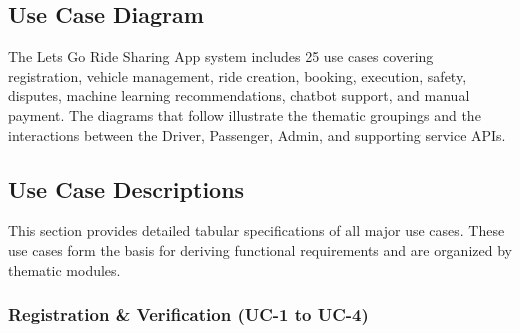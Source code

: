 \subsection{Use Case Diagram}

The Lets Go Ride Sharing App system includes 25 use cases covering registration, vehicle management, ride creation, booking, execution, safety, disputes, machine learning recommendations, chatbot support, and manual payment. The diagrams that follow illustrate the thematic groupings and the interactions between the Driver, Passenger, Admin, and supporting service APIs.
\subsection{Use Case Descriptions}

This section provides detailed tabular specifications of all major use cases. These use cases form the basis for deriving functional requirements and are organized by thematic modules.
\subsubsection{Registration \& Verification (UC-1 to UC-4)}

